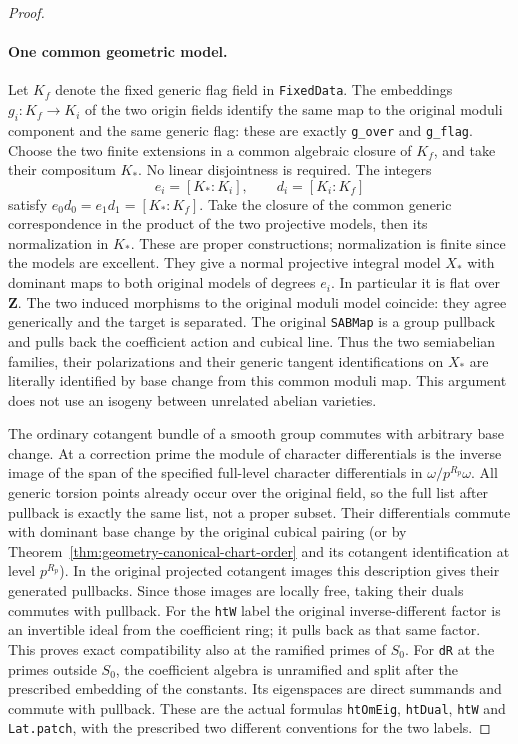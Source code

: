 \begin{proof}
\paragraph{One common geometric model.}
Let \(K_f\) denote the fixed generic flag field in
\texttt{FixedData}. The embeddings \(g_i:K_f\to K_i\)
of the two origin fields identify the same map to the
original moduli component and the same generic flag:
these are exactly \texttt{g\_over} and \texttt{g\_flag}.
Choose the two finite extensions in a common algebraic
closure of \(K_f\), and take their compositum \(K_*\).
No linear disjointness is required. The integers
\[
                 e_i=[K_*:K_i],\qquad d_i=[K_i:K_f]
\]
satisfy \(e_0d_0=e_1d_1=[K_*:K_f]\).
Take the closure of the common generic correspondence
in the product of the two projective models, then its
normalization in \(K_*\). These are proper constructions;
normalization is finite since the models are excellent.
They give a normal projective integral model \(X_*\)
with dominant maps to both original models of degrees
\(e_i\). In particular it is flat over \(\mathbf Z\).
The two induced morphisms to the original moduli model
coincide: they agree generically and the target is separated.
The original \texttt{SABMap} is a group pullback and
pulls back the coefficient action and cubical line.
Thus the two semiabelian families, their polarizations
and their generic tangent identifications on \(X_*\)
are literally identified by base change from this common
moduli map. This argument does not use an isogeny between
unrelated abelian varieties.

The ordinary cotangent bundle of a smooth group commutes
with arbitrary base change. At a correction prime the
module of character differentials is the inverse image
of the span of the specified full-level character
differentials in \(\omega/p^{R_p}\omega\).
All generic torsion points already occur over the original
field, so the full list after pullback is exactly the same
list, not a proper subset. Their differentials commute with
dominant base change by the original cubical pairing
(or by Theorem~\ref{thm:geometry-canonical-chart-order}
and its cotangent identification at level \(p^{R_p}\)).
In the original projected cotangent images this description
gives their generated pullbacks. Since those images are
locally free, taking their duals commutes with pullback.
For the \texttt{htW} label the original inverse-different
factor is an invertible ideal from the coefficient ring;
it pulls back as that same factor. This proves exact
compatibility also at the ramified primes of \(S_0\).
For \texttt{dR} at the primes outside \(S_0\), the
coefficient algebra is unramified and split after the
prescribed embedding of the constants. Its eigenspaces are
direct summands and commute with pullback.
These are the actual formulas \texttt{htOmEig},
\texttt{htDual}, \texttt{htW} and \texttt{Lat.patch}, with
the prescribed two different conventions for the two labels.


\end{proof}
